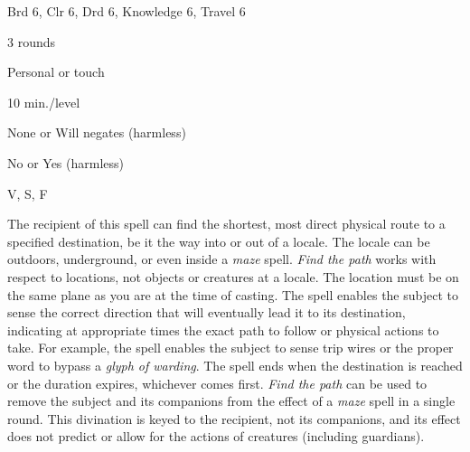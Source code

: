 
\begin{description*}
\item[Level:] Brd 6, Clr 6, Drd 6, Knowledge 6, Travel 6
\item[Casting Time:] 3 rounds
\item[Range:] Personal or touch
\item[Duration:] 10 min./level
\item[Saving Throw:] None or Will negates (harmless)
\item[Spell Resistance:] No or Yes (harmless)
\item[Components:] V, S, F
\end{description*}

The recipient of this spell can find the shortest, most direct physical route to
a specified destination, be it the way into or out of a locale. The locale can
be outdoors, underground, or even inside a \textit{maze} spell. \textit{Find the
path} works with respect to locations, not objects or creatures at a locale. The
location must be on the same plane as you are at the time of casting.
The spell enables the subject to sense the correct direction that will eventually
lead it to its destination, indicating at appropriate times the exact path to follow
or physical actions to take. For example, the spell enables the subject to sense
trip wires or the proper word to bypass a \textit{glyph of warding}. The spell
ends when the destination is reached or the duration expires, whichever comes first.
\textit{Find the path} can be used to remove the subject and its companions from
the effect of a \textit{maze} spell in a single round.
This divination is keyed to the recipient, not its companions, and its effect does
not predict or allow for the actions of creatures (including guardians).